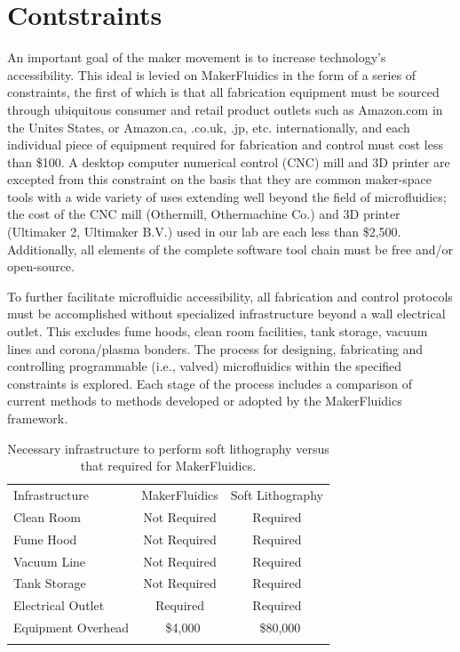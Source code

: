 \section{Contstraints}
\label{sec:mfConstraints}
An important goal of the maker movement is to increase technology's accessibility. This ideal is levied on MakerFluidics in the form of a series of constraints, the first of which is that all fabrication equipment must be sourced through ubiquitous consumer and retail product outlets such as Amazon.com in the Unites States, or Amazon.ca, .co.uk, .jp, etc. internationally, and each individual piece of equipment required for fabrication and control must cost less than \$100. A desktop computer numerical control (CNC) mill and 3D printer are excepted from this constraint on the basis that they are common maker-space tools with a wide variety of uses extending well beyond the field of microfluidics; the cost of the CNC mill (Othermill, Othermachine Co.) and 3D printer (Ultimaker 2, Ultimaker B.V.) used in our lab are each less than \$2,500. Additionally, all elements of the complete software tool chain must be free and/or open-source. 

To further facilitate microfluidic accessibility, all fabrication and control protocols must be accomplished without specialized infrastructure beyond a wall electrical outlet. This excludes fume hoods, clean room facilities, tank storage, vacuum lines and corona/plasma bonders. The process for designing, fabricating and controlling programmable (i.e., valved) microfluidics within the specified constraints is explored. Each stage of the process includes a comparison of current methods to methods developed or adopted by the MakerFluidics framework. 

\begin{table}[H]
\caption[Infrastructure Requirements for Soft Lithography versus MakerFluidics]{Necessary infrastructure to perform soft lithography versus that required for MakerFluidics.}
\label{tab:mfInf}       %
\centering
\begin{tabular}{lcc}
\hline\noalign{\smallskip}
Infrastructure & MakerFluidics & Soft Lithography\\
\noalign{\smallskip}\hline\noalign{\smallskip}
Clean Room & Not Required & Required \\
Fume Hood & Not Required & Required \\
Vacuum Line & Not Required & Required \\
Tank Storage & Not Required & Required \\
Electrical Outlet & Required & Required \\
Equipment Overhead & ~\$4,000 & ~\$80,000 \\
\noalign{\smallskip}\hline
\end{tabular}
\end{table}


